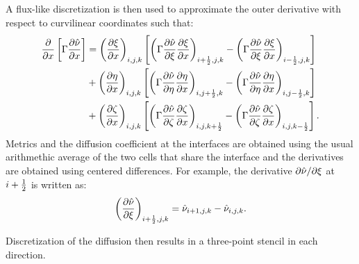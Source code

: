 A flux-like discretization is then used to approximate the outer derivative with respect to curvilinear coordinates such that:
\begin{align*}
    \pdiff{}{x}\left[\Gamma\pdiff{\sa}{x}\right] &=
    \left(\pdiff{\xi}{x}\right)_{i,j,k}\left[
        \left(
            \Gamma\pdiff{\sa}{\xi}\pdiff{\xi}{x}
        \right)_{i+\half,j,k}
        -
        \left(
            \Gamma\pdiff{\sa}{\xi}\pdiff{\xi}{x}
        \right)_{i-\half,j,k}
    \right]
    \\
    &+
    \left(\pdiff{\eta}{x}\right)_{i,j,k}\left[
        \left(
            \Gamma\pdiff{\sa}{\eta}\pdiff{\eta}{x}
        \right)_{i,j+\half,k}
        -
        \left(
            \Gamma\pdiff{\sa}{\eta}\pdiff{\eta}{x}
        \right)_{i,j-\half,k}
    \right]
    \\
    &+
    \left(\pdiff{\zeta}{x}\right)_{i,j,k}\left[
        \left(
            \Gamma\pdiff{\sa}{\zeta}\pdiff{\zeta}{x}
        \right)_{i,j,k+\half}
        -
        \left(
            \Gamma\pdiff{\sa}{\zeta}\pdiff{\zeta}{x}
        \right)_{i,j,k-\half}
    \right].
\end{align*}
Metrics and the diffusion coefficient at the interfaces are obtained using the usual arithmethic average of the two cells that share the interface and the derivatives are obtained using centered differences. For example, the derivative $\partial \sa/\partial \xi$ at $i + \frac{1}{2}$ is written as:
\begin{equation*}
    \left(\pdiff{\sa}{\xi}\right)_{i+\half,j,k} =
    \sa_{i+1,j,k} - \sa_{i,j,k}.
\end{equation*}

Discretization of the diffusion then results in a three-point stencil in each direction.
%

